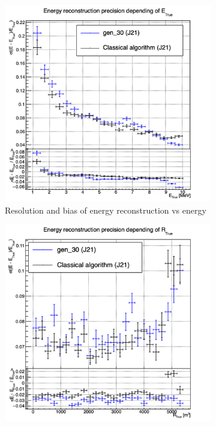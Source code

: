 \documentclass[../main.tex]{subfiles}
\begin{document}
\begin{figure}[ht]
  \centering
  \begin{subfigure}[t]{0.32\linewidth}
    \centering
    \includegraphics[width=\linewidth]{images/jcnn/vic_cnn/multi_vic_cnn_MESBvETC.png}
    \caption{Resolution and bias of energy reconstruction vs energy}
    \label{fig:jcnn:vic_cnn:multi_vic_cnn_MESBvETC}
  \end{subfigure}
  \begin{subfigure}[t]{0.32\linewidth}
    \centering
    \includegraphics[width=\linewidth]{images/jcnn/vic_cnn/multi_vic_cnn_MESBvRTC.png}

\end{subfigure}
\end{figure}
\end{document}
